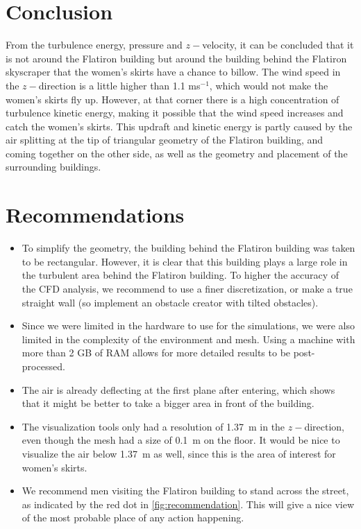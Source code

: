 \section{Conclusion}
From the turbulence energy, pressure and $z-$velocity, it can be concluded that it is not around the Flatiron building but around the building behind the Flatiron skyscraper that the women's skirts have a chance to billow. The wind speed in the $z-$direction is a little higher than 1.1 ms$^{-1}$, which would not make the women's skirts fly up. However, at that corner there is a high concentration of turbulence kinetic energy, making it possible that the wind speed increases and catch the women's skirts. This updraft and kinetic energy is partly caused by the air splitting at the tip of triangular geometry of the Flatiron building, and coming together on the other side, as well as the geometry and placement of the surrounding buildings.

\section{Recommendations}
\begin{itemize}
\item To simplify the geometry, the building behind the Flatiron building was taken to be rectangular. However, it is clear that this building plays a large role in the turbulent area behind the Flatiron building. To higher the accuracy of the CFD analysis, we recommend to use a finer discretization, or make a true straight wall (so implement an obstacle creator with tilted obstacles).

\item Since we were limited in the hardware to use for the simulations, we were also limited in the complexity of the environment and mesh. Using a machine with more than 2 GB of RAM allows for more detailed results to be post-processed. 

\item The air is already deflecting at the first plane after entering, which shows that it might be better to take a bigger area in front of the building. 

\item The visualization tools only had a resolution of 1.37~m in the $z-$direction, even though the mesh had a size of 0.1~m on the floor. It would be nice to visualize the air below 1.37~m as well, since this is the area of interest for women's skirts. 

\item We recommend men visiting the Flatiron building to stand across the street, as indicated by the red dot in \autoref{fig:recommendation}. This will give a nice view of the most probable place of any action happening. 
\end{itemize}

